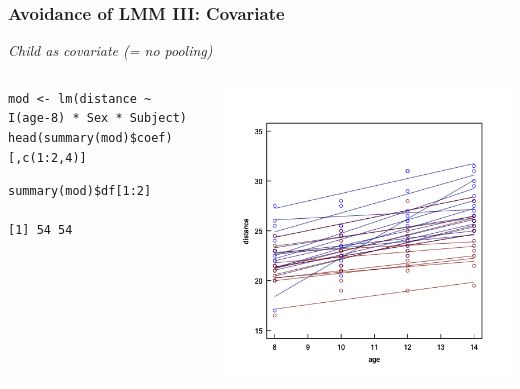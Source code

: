 \documentclass{beamer}
\begin{document}
\begin{frame}[fragile]
    \frametitle{Avoidance of LMM III: Covariate}
    \textit{Child as covariate (= no pooling)}
    \begin{columns}
        \begin{column}{0.6\textwidth}
            \small\begin{verbatim}
mod <- lm(distance ~ I(age-8) * Sex * Subject)
head(summary(mod)$coef)[,c(1:2,4)]
            \end{verbatim}
            \tiny\scalebox{1}{
            
            }
            \normalsize\begin{verbatim}
summary(mod)$df[1:2]

[1] 54 54
            \end{verbatim}
        \end{column}
        \begin{column}{0.4\textwidth}
            \includegraphics[width=\textwidth]{lectures/day_6_praxis_and_fitting_of_mems/figures/unnamed-chunk-9-1.png}
        \end{column}
    \end{columns}
    \vspace{0.5cm}
\end{frame}
\end{document}
